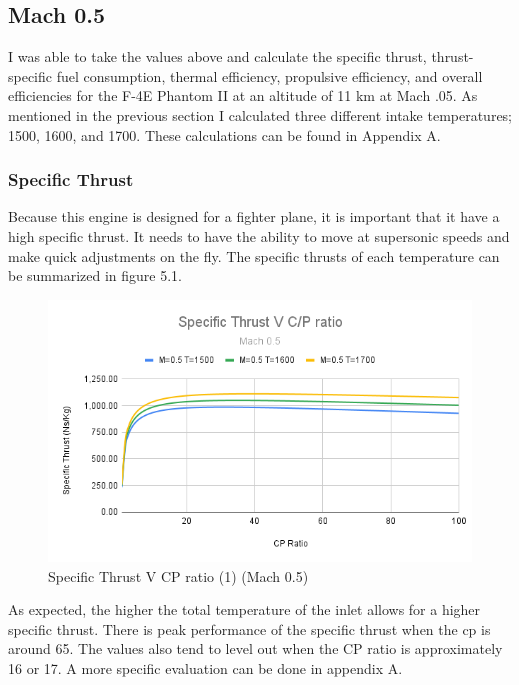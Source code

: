 \documentclass[12pt]{report}
\begin{document}
\subsection{Mach 0.5}
I was able to take the values above and calculate the specific thrust, thrust-specific fuel consumption, thermal efficiency, propulsive efficiency, and overall efficiencies for the F-4E Phantom II at an altitude of 11 km at Mach .05. As mentioned in the previous section I calculated three different intake temperatures; 1500, 1600, and 1700.  These calculations can be found in Appendix A.\\
\subsubsection{Specific Thrust}
Because this engine is designed for a fighter plane, it is important that it have a high specific thrust.  It needs to have the ability to move at supersonic speeds and make quick adjustments on the fly. The specific thrusts of each temperature can be summarized in figure 5.1.

\begin{figure}[H]
    \centering
    \includegraphics[width=15.5 cm]{Specific Thrust V C_P ratio (1) (Mach 0.5).png}
    \caption{Specific Thrust V CP ratio (1) (Mach 0.5)}
    \label{fig:Specific Thrust V C_P ratio (1) (Mach 0.5)}
\end{figure}

As expected, the higher the total temperature of the inlet allows for a higher specific thrust. There is peak performance of the specific thrust when the cp is around 65. The values also tend to level out when the CP ratio is approximately 16 or 17. A more specific evaluation can be done in appendix A.
\end{document}
